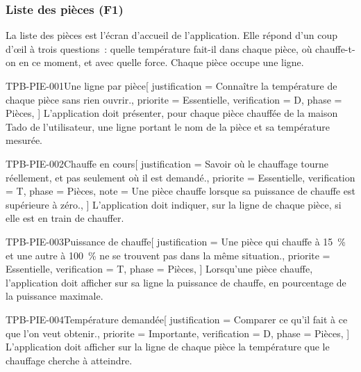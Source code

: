 \subsubsection{Liste des pièces (F1)}

La liste des pièces est l'écran d'accueil de l'application. Elle répond d'un coup d'œil à
trois questions~: quelle température fait-il dans chaque pièce, où chauffe-t-on en ce
moment, et avec quelle force. Chaque pièce occupe une ligne.

\begin{exigence}{TPB-PIE-001}{Une ligne par pièce}[
    justification = {Connaître la température de chaque pièce sans rien ouvrir.},
    priorite      = {Essentielle},
    verification  = {D},
    phase         = {Pièces},
  ]
  L'application doit présenter, pour chaque pièce chauffée de la maison Tado de
  l'utilisateur, une ligne portant le nom de la pièce et sa température mesurée.
\end{exigence}

\begin{exigence}{TPB-PIE-002}{Chauffe en cours}[
    justification = {Savoir où le chauffage tourne réellement, et pas seulement où il est
                     demandé.},
    priorite      = {Essentielle},
    verification  = {T},
    phase         = {Pièces},
    note          = {Une pièce chauffe lorsque sa puissance de chauffe est supérieure à
                     zéro.},
  ]
  L'application doit indiquer, sur la ligne de chaque pièce, si elle est en train de
  chauffer.
\end{exigence}

\begin{exigence}{TPB-PIE-003}{Puissance de chauffe}[
    justification = {Une pièce qui chauffe à 15~\% et une autre à 100~\% ne se trouvent
                     pas dans la même situation.},
    priorite      = {Essentielle},
    verification  = {T},
    phase         = {Pièces},
  ]
  Lorsqu'une pièce chauffe, l'application doit afficher sur sa ligne la puissance de
  chauffe, en pourcentage de la puissance maximale.
\end{exigence}

\begin{exigence}{TPB-PIE-004}{Température demandée}[
    justification = {Comparer ce qu'il fait à ce que l'on veut obtenir.},
    priorite      = {Importante},
    verification  = {D},
    phase         = {Pièces},
  ]
  L'application doit afficher sur la ligne de chaque pièce la température que le
  chauffage cherche à atteindre.
\end{exigence}

